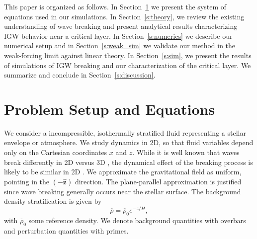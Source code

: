 \documentclass[
        fleqn,
        usenatbib,
    ]{mnras}
\newcommand*{\uv}[1]{\hat{\mathbf{#1}}}
\begin{document}
This paper is organized as follows. In Section~\ref{s:equations} we present the
system of equations used in our simulations. In Section~\ref{s:theory}, we
review the existing understanding of wave breaking and present analytical
results characterizing IGW behavior near a critical layer. In
Section~\ref{s:numerics} we describe our numerical setup and in
Section~\ref{s:weak_sim} we validate our method in the weak-forcing limit
against linear theory. In Section~\ref{s:sim}, we present the results of
simulations of IGW breaking and our characterization of the critical layer. We
summarize and conclude in Section~\ref{s:discussion}.

\section{Problem Setup and Equations}\label{s:equations}

We consider a incompressible, isothermally stratified fluid representing a
stellar envelope or atmosphere. We study dynamics in 2D, so that fluid variables
depend only on the Cartesian coordinates $x$ and $z$. \textcolor{Corr}{While it
is well known that waves break differently in 2D versus 3D} \citep{klostermeyer,
winters1994}, the dynamical effect of the breaking process is likely to be
similar in 2D \citep{barker_ogilvie}. We approximate the gravitational field as
uniform, pointing in the $(-\uv{z})$ direction. The plane-parallel approximation
is justified since wave breaking generally occurs near the stellar surface. The
background density stratification is given by
\begin{equation}
    \overline{\rho} = \overline{\rho}_0 e^{-z/H},
\end{equation}
with $\overline{\rho}_0$ some reference density. We denote background quantities
with overbars and perturbation quantities with primes.
\end{document}
